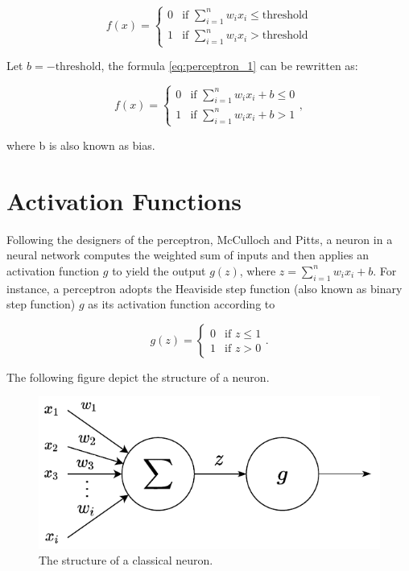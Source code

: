 \documentclass[
	parskip, 			   %
	twoside, 			   %
	DIV=14, 			   %
	BCOR=15.0mm, 		   %
	headsepline, 		   %
	open=right, 		   %
	captions=tableheading, %
	bibliography=totoc,    %
	numbers=noenddot       %
]{scrreprt}
\begin{document}
\begin{equation}
    \label{eq:perceptron_1}
    f(x)=\begin{cases}0 & \text{if } \sum\nolimits_{i=1}^n w_{i} x_{i} \leq \text{threshold} \\ 1 & \text{if } \sum\nolimits_{i=1}^n w_{i} x_{i}>\text{threshold}\end{cases}
\end{equation}

Let $b=-\text{threshold}$, the formula \ref{eq:perceptron_1} can be rewritten as:

\begin{equation}
    \label{eq:perceptron_2}
    f(x)=\begin{cases}0 & \text{if } \sum\nolimits_{i=1}^n w_{i} x_{i}+b \leq 0 \\ 1 & \text{if } \sum\nolimits_{i=1}^n w_{i} x_{i}+b>1\end{cases},
\end{equation}

where b is also known as bias. 

\section{Activation Functions}
Following the designers of the perceptron, McCulloch and Pitts, a neuron in a neural network computes the weighted sum of inputs and then applies an activation function $g$ to yield the output $g(z)$, where $z=\sum\nolimits_{i=1}^n w_{i} x_{i} + b$. For instance, a perceptron adopts the Heaviside step function (also known as binary step function) $g$ as its activation function according to

\begin{equation}
    \label{eq:activation_function}
    g(z)=\begin{cases} 0 & \text{if } z\leq 1 \\ 1  & \text{if } z>0
    \end{cases}.
\end{equation}

The following figure depict the structure of a neuron.

\begin{figure}[h!]
    \centering
    \includegraphics[scale=1]{figures/activation_function.pdf}
    \caption{The structure of a classical neuron.}
    \label{fig:neuron_structure}
\end{figure}
\end{document}
